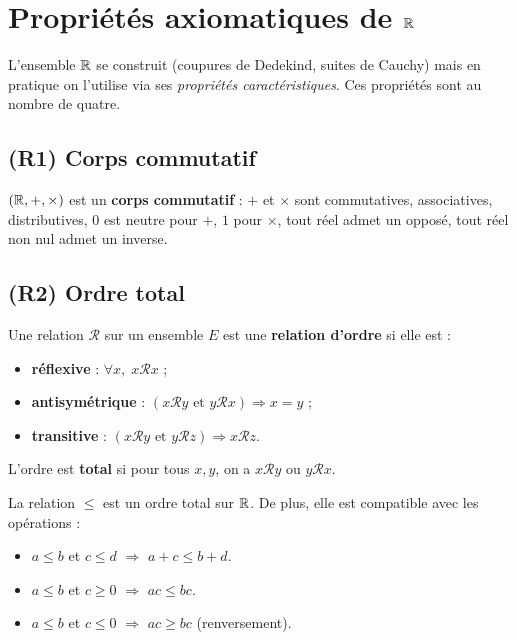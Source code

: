 \section{Propriétés axiomatiques de $\mathbb{R}$}

L'ensemble $\mathbb{R}$ se construit (coupures de Dedekind, suites de Cauchy) mais en pratique on l'utilise via ses \emph{propriétés caractéristiques}. Ces propriétés sont au nombre de quatre.

\subsection{(R1) Corps commutatif}

\begin{propbox}
$(\mathbb{R}, +, \times)$ est un \textbf{corps commutatif} : $+$ et $\times$ sont commutatives, associatives, distributives, $0$ est neutre pour $+$, $1$ pour $\times$, tout réel admet un opposé, tout réel non nul admet un inverse.
\end{propbox}

\subsection{(R2) Ordre total}

\begin{defbox}
Une relation $\mathcal{R}$ sur un ensemble $E$ est une \textbf{relation d'ordre} si elle est :
\begin{itemize}[leftmargin=1cm]
  \item \textbf{réflexive} : $\forall x,\; x \mathcal{R} x$ ;
  \item \textbf{antisymétrique} : $(x \mathcal{R} y \text{ et } y \mathcal{R} x) \Rightarrow x = y$ ;
  \item \textbf{transitive} : $(x \mathcal{R} y \text{ et } y \mathcal{R} z) \Rightarrow x \mathcal{R} z$.
\end{itemize}
L'ordre est \textbf{total} si pour tous $x, y$, on a $x \mathcal{R} y$ ou $y \mathcal{R} x$.
\end{defbox}

\begin{propbox}
La relation $\leqslant$ est un ordre total sur $\mathbb{R}$. De plus, elle est compatible avec les opérations :
\begin{itemize}[leftmargin=1cm]
  \item $a \leqslant b$ et $c \leqslant d$ $\Rightarrow$ $a + c \leqslant b + d$.
  \item $a \leqslant b$ et $c \geqslant 0$ $\Rightarrow$ $ac \leqslant bc$.
  \item $a \leqslant b$ et $c \leqslant 0$ $\Rightarrow$ $ac \geqslant bc$ (renversement).
\end{itemize}
\end{propbox}

